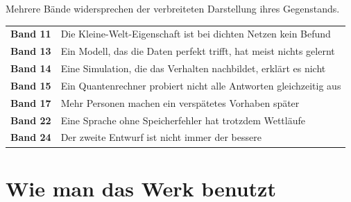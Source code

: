 \begin{warnung}
Mehrere Bände widersprechen der verbreiteten Darstellung ihres Gegenstands.

\begin{center}
\renewcommand{\arraystretch}{1.5}
\begin{tabular}{@{}P{2.2cm}P{6.6cm}@{}}
\toprule
\textbf{Band 11} & Die Kleine-Welt-Eigenschaft ist bei dichten Netzen kein Befund\\
\textbf{Band 13} & Ein Modell, das die Daten perfekt trifft, hat meist nichts gelernt\\
\textbf{Band 14} & Eine Simulation, die das Verhalten nachbildet, erklärt es nicht\\
\textbf{Band 15} & Ein Quantenrechner probiert nicht alle Antworten gleichzeitig aus\\
\textbf{Band 17} & Mehr Personen machen ein verspätetes Vorhaben später\\
\textbf{Band 22} & Eine Sprache ohne Speicherfehler hat trotzdem Wettläufe\\
\textbf{Band 24} & Der zweite Entwurf ist nicht immer der bessere\\
\bottomrule
\end{tabular}
\end{center}

\begin{center}
\begin{minipage}{0.88\textwidth}
\end{minipage}
\end{center}
\end{warnung}

\section{Wie man das Werk benutzt}

